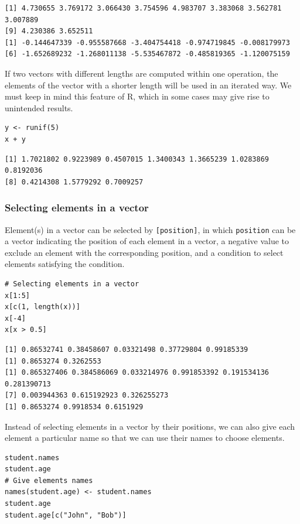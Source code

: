 \documentclass[a4paper,11pt]{article}
\begin{document}
\begin{verbatim}
[1] 4.730655 3.769172 3.066430 3.754596 4.983707 3.383068 3.562781 3.007889
[9] 4.230386 3.652511
[1] -0.144647339 -0.955587668 -3.404754418 -0.974719845 -0.008179973
[6] -1.652689232 -1.268011138 -5.535467872 -0.485819365 -1.120075159
\end{verbatim}

If two vectors with different lengths are computed within one
operation, the elements of the vector with a shorter length will be
used in an iterated way. We must keep in mind this feature of R, which
in some cases may give rise to unintended results.

\begin{verbatim}
y <- runif(5)
x + y
\end{verbatim}

\begin{verbatim}
[1] 1.7021802 0.9223989 0.4507015 1.3400343 1.3665239 1.0283869 0.8192036
[8] 0.4214308 1.5779292 0.7009257
\end{verbatim}

\subsubsection*{Selecting elements in a vector}
\label{sec:orgbc84a85}

Element(s) in a vector can be selected by \texttt{[position]}, in which
\texttt{position} can be a vector indicating the position of each element in
a vector, a negative value to exclude an element with the
corresponding position, and a condition to select elements satisfying
the condition.

\begin{verbatim}
# Selecting elements in a vector
x[1:5]
x[c(1, length(x))]
x[-4]
x[x > 0.5]
\end{verbatim}

\begin{verbatim}
[1] 0.86532741 0.38458607 0.03321498 0.37729804 0.99185339
[1] 0.8653274 0.3262553
[1] 0.865327406 0.384586069 0.033214976 0.991853392 0.191534136 0.281390713
[7] 0.003944363 0.615192923 0.326255273
[1] 0.8653274 0.9918534 0.6151929
\end{verbatim}

Instead of selecting elements in a vector by their positions, we can
also give each element a particular name so that we can use their
names to choose elements.

\begin{verbatim}
student.names
student.age
# Give elements names
names(student.age) <- student.names
student.age
student.age[c("John", "Bob")]
\end{verbatim}
\end{document}
